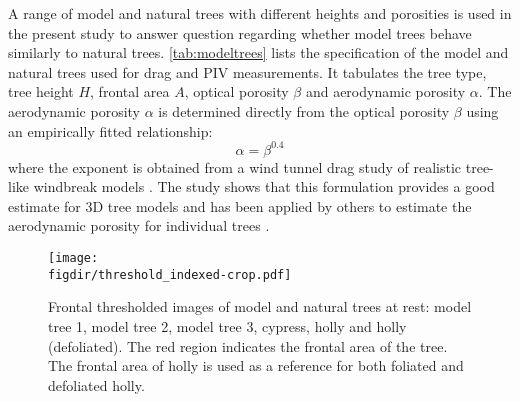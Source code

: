 A range of model and natural trees with different heights and porosities is used in the present study to answer question regarding whether model trees behave similarly to natural trees. \cref{tab:modeltrees} lists the specification of the model and natural trees used for drag and PIV measurements. It tabulates the tree type, tree height $H$, frontal area $A$, optical porosity $\beta$ and aerodynamic porosity $\alpha$. The aerodynamic porosity $\alpha$ is determined directly from the optical porosity $\beta$ using an empirically fitted relationship:
\begin{equation}
\alpha = \beta^{0.4}
\label{eq:aerodynamicporosity}
\end{equation}
where the exponent is obtained from a wind tunnel drag study of realistic tree-like windbreak models \citep{Guan2003}. The study shows that this formulation provides a good estimate for 3D tree models and has been applied by others to estimate the aerodynamic porosity for individual trees \citep{Bitog2011b,Lee2014565,Rosenfeld2010}.

	\begin{figure}[p]
	\centering
	\texttt{[image: \\figdir/threshold\_indexed-crop.pdf]}
	\caption{Frontal thresholded images of model and natural trees at rest:  model tree 1,  model tree 2,  model tree 3,  cypress,  holly and  holly (defoliated). The red region indicates the frontal area of the tree. The frontal area of holly is used as a reference for both foliated and defoliated holly.}
	\label{fig:thresholdindexed}
	\end{figure}

